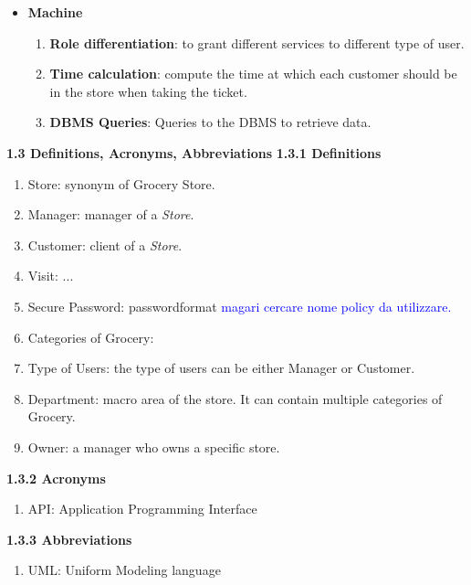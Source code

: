 \documentclass[a4paper, 10pt, oneside]{article}
\newcommand*{\lorenzo}[1]{\textcolor{BurntOrange}{#1}}
\newcommand{\giovanni}[1]{\textcolor{Blue}{#1}}
\begin{document}
\begin{itemize}
\begin{enumerate}[label={S.S.\arabic{*}}]
        \item
    \end{enumerate}
        \item {\large \textbf{Machine}}
        \begin{enumerate}[label={S.M.\arabic{*}}]
            \item \textbf{Role differentiation}:  to grant different services to different type of user.
            \item \textbf{Time calculation}: compute the time at which each customer should be in the store when taking the ticket.
            \item \textbf{DBMS Queries}: Queries to the DBMS to retrieve data.
        
        
		\end{enumerate}
\end{itemize}


{\large \textbf{1.3 Definitions, Acronyms, Abbreviations}}
\newline \newline
\textbf{1.3.1 Definitions}

\begin{enumerate}[label={D.\arabic{*}}]
\item \label{def:store} Store: synonym of Grocery Store.
\item \label{def:manager} Manager: manager of a \textit{Store}. %
\item \label{def:customer} Customer: client of a \textit{Store}. %
\item \label{def:visit} Visit: ... %
\item \label{def:securepass} Secure Password: \lorenzo{passwordformat} \giovanni{magari cercare nome policy da utilizzare.}
\item \label{def:categoriesOfGroceries} Categories of Grocery:
\item \label{def:TypeOfUser}Type of Users: the type of users can be either Manager or Customer.
\item \label{def:department}Department: macro area of the store. It can contain multiple categories of Grocery.
\item \label{def:owner}Owner: a manager who owns a specific store.
\end{enumerate}

\textbf{1.3.2 Acronyms}
\begin{enumerate}[label={A.\arabic{*}}]
\item \label{def:API} API: Application Programming Interface
\end{enumerate}
\textbf{1.3.3 Abbreviations}
\begin{enumerate}[label={AB.\arabic{*}}]
\item \label{def:UML} UML: Uniform Modeling language
\end{enumerate}
\end{document}
